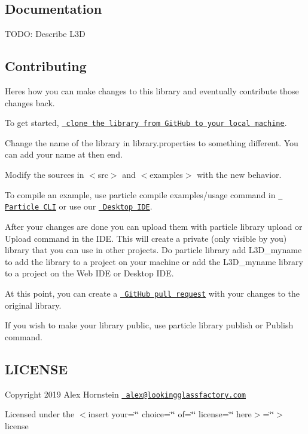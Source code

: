 \subsection*{Documentation}

T\+O\+DO\+: Describe {\ttfamily L3D}

\subsection*{Contributing}

Here\textquotesingle{}s how you can make changes to this library and eventually contribute those changes back.

To get started, \href{https://help.github.com/articles/cloning-a-repository/}{\texttt{ clone the library from Git\+Hub to your local machine}}.

Change the name of the library in {\ttfamily library.\+properties} to something different. You can add your name at then end.

Modify the sources in $<$src$>$ and $<$examples$>$ with the new behavior.

To compile an example, use {\ttfamily particle compile examples/usage} command in \href{https://docs.particle.io/guide/tools-and-features/cli\#update-your-device-remotely}{\texttt{ Particle C\+LI}} or use our \href{https://docs.particle.io/guide/tools-and-features/dev/\#compiling-code}{\texttt{ Desktop I\+DE}}.

After your changes are done you can upload them with {\ttfamily particle library upload} or {\ttfamily Upload} command in the I\+DE. This will create a private (only visible by you) library that you can use in other projects. Do {\ttfamily particle library add L3\+D\+\_\+myname} to add the library to a project on your machine or add the L3\+D\+\_\+myname library to a project on the Web I\+DE or Desktop I\+DE.

At this point, you can create a \href{https://help.github.com/articles/about-pull-requests/}{\texttt{ Git\+Hub pull request}} with your changes to the original library.

If you wish to make your library public, use {\ttfamily particle library publish} or {\ttfamily Publish} command.

\subsection*{L\+I\+C\+E\+N\+SE}

Copyright 2019 Alex Hornstein \href{mailto:alex@lookingglassfactory.com}{\texttt{ alex@lookingglassfactory.\+com}}

Licensed under the $<$insert your=\char`\"{}\char`\"{} choice=\char`\"{}\char`\"{} of=\char`\"{}\char`\"{} license=\char`\"{}\char`\"{} here$>$=\char`\"{}\char`\"{}$>$ license 